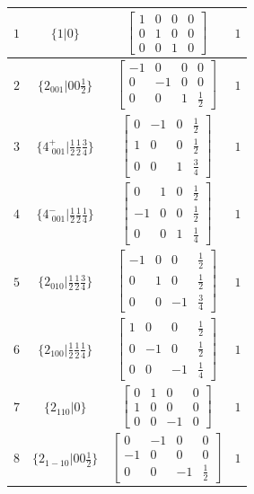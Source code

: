 \documentclass[fleqn,8pt]{jsarticle}
\begin{document}
\begin{longtable}{cccc}
$ 1 $ & $ \{1|0\} $ & $ \begin{bmatrix} 1 & 0 & 0 & 0 \\ 0 & 1 & 0 & 0 \\ 0 & 0 & 1 & 0 \end{bmatrix} $ & $ 1 $ \\ \hline
$ 2 $ & $ \{2{}_{001}|0 0 \frac{1}{2}\} $ & $ \begin{bmatrix} -1 & 0 & 0 & 0 \\ 0 & -1 & 0 & 0 \\ 0 & 0 & 1 & \frac{1}{2} \end{bmatrix} $ & $ 1 $ \\ \hline
$ 3 $ & $ \{4^{+}_{\,\,001}|\frac{1}{2} \frac{1}{2} \frac{3}{4}\} $ & $ \begin{bmatrix} 0 & -1 & 0 & \frac{1}{2} \\ 1 & 0 & 0 & \frac{1}{2} \\ 0 & 0 & 1 & \frac{3}{4} \end{bmatrix} $ & $ 1 $ \\ \hline
$ 4 $ & $ \{4^{-}_{\,\,001}|\frac{1}{2} \frac{1}{2} \frac{1}{4}\} $ & $ \begin{bmatrix} 0 & 1 & 0 & \frac{1}{2} \\ -1 & 0 & 0 & \frac{1}{2} \\ 0 & 0 & 1 & \frac{1}{4} \end{bmatrix} $ & $ 1 $ \\ \hline
$ 5 $ & $ \{2{}_{010}|\frac{1}{2} \frac{1}{2} \frac{3}{4}\} $ & $ \begin{bmatrix} -1 & 0 & 0 & \frac{1}{2} \\ 0 & 1 & 0 & \frac{1}{2} \\ 0 & 0 & -1 & \frac{3}{4} \end{bmatrix} $ & $ 1 $ \\ \hline
$ 6 $ & $ \{2{}_{100}|\frac{1}{2} \frac{1}{2} \frac{1}{4}\} $ & $ \begin{bmatrix} 1 & 0 & 0 & \frac{1}{2} \\ 0 & -1 & 0 & \frac{1}{2} \\ 0 & 0 & -1 & \frac{1}{4} \end{bmatrix} $ & $ 1 $ \\ \hline
$ 7 $ & $ \{2{}_{110}|0\} $ & $ \begin{bmatrix} 0 & 1 & 0 & 0 \\ 1 & 0 & 0 & 0 \\ 0 & 0 & -1 & 0 \end{bmatrix} $ & $ 1 $ \\ \hline
$ 8 $ & $ \{2{}_{1-10}|0 0 \frac{1}{2}\} $ & $ \begin{bmatrix} 0 & -1 & 0 & 0 \\ -1 & 0 & 0 & 0 \\ 0 & 0 & -1 & \frac{1}{2} \end{bmatrix} $ & $ 1 $ \\
\end{longtable}
\end{document}

